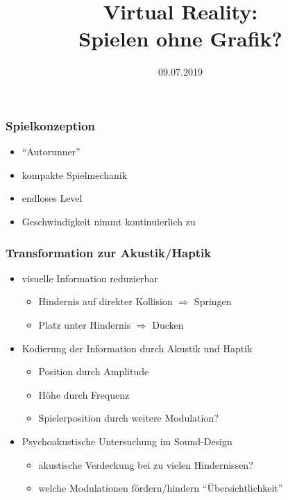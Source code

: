 \documentclass{beamer}
\title{Virtual Reality:\\Spielen ohne Grafik?}
\date{09.07.2019}
\begin{document}
\begin{frame}
\titlepage
\end{frame}

\begin{frame}
\frametitle{Spielkonzeption}

\begin{adjustbox}{max totalsize={.9\textwidth}{.7\textheight}, center}
\end{adjustbox}

\begin{itemize}
	\item "`Autorunner"'
	\item kompakte Spielmechanik
	\item endloses Level
	\item Geschwindigkeit nimmt kontinuierlich zu
\end{itemize}

\end{frame}

\begin{frame}
\frametitle{Transformation zur Akustik/Haptik}

\begin{itemize}
	\item visuelle Information reduzierbar
	\begin{itemize}
		\item Hindernis auf direkter Kollision \( \Rightarrow \) Springen
		\item Platz unter Hindernis \( \Rightarrow \) Ducken
	\end{itemize}

	\item Kodierung der Information durch Akustik und Haptik
	\begin{itemize}
		\item Position durch Amplitude
		\item Höhe durch Frequenz
		\item Spielerposition durch weitere Modulation?
	\end{itemize}

	\item Psychoakustische Untersuchung im Sound-Design
	\begin{itemize}
		\item akustische Verdeckung bei zu vielen Hindernissen?
		\item welche Modulationen fördern/hindern "`Übersichtlichkeit"'
	\end{itemize}
\end{itemize}
\end{frame}
\end{document}
